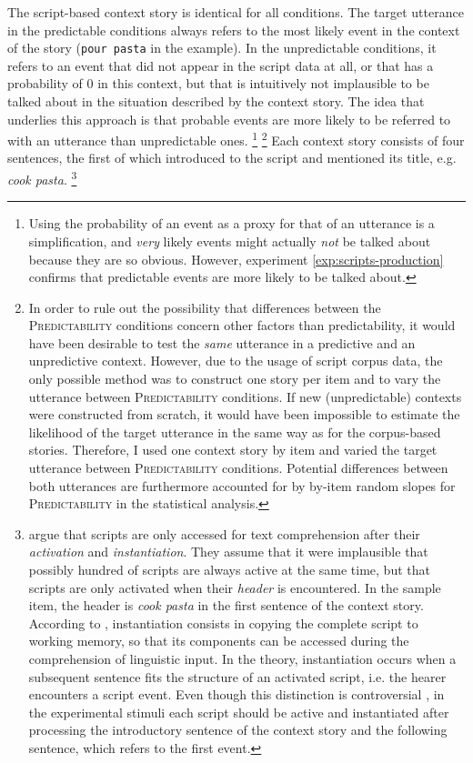 \largerpage[-2]
The script-based context story is identical for all conditions. The target utterance in the predictable conditions always refers to the most likely event in the context of the story (\texttt{pour pasta} in the example). In the unpredictable conditions, it refers to an event that did not appear in the script data at all, or that has a probability of 0 in this context, but that is intuitively not implausible to be talked about in the situation described by the context story. The idea that underlies this approach is that probable events are more likely to be referred to with an utterance than unpredictable ones.%
%
\footnote{Using the probability of an event as a proxy for that of an utterance is a simplification, and \textit{very} likely events might actually \textit{not} be talked about because they are so obvious. However, experiment \ref{exp:scripts-production} confirms that predictable events are more likely to be talked about.}\afterfn%
%
\footnote{In order to rule out the possibility that differences between the \textsc{Predictability} conditions concern other factors than predictability, it would have been desirable to test the \textit{same} utterance in a predictive and an unpredictive context. However, due to the usage of script corpus data, the only possible method was to construct one story per item and to vary the utterance between \textsc{Predictability} conditions. If new (unpredictable) contexts were constructed from scratch, it would have been impossible to estimate the likelihood of the target utterance in the same way as for the corpus-based stories. Therefore, I used one context story by item and varied the target utterance between \textsc{Predictability} conditions. Potential differences between both utterances are furthermore accounted for by by-item random slopes for \textsc{Predictability} in the statistical analysis.}\afterfn%
%
Each context story consists of four sentences, the first of which introduced to the script and mentioned its title, e.g. \textit{cook pasta}.%
% 
\footnote{\citet{schank.abelson1977} argue that scripts are only accessed for text comprehension after their \textit{activation} and \textit{instantiation}. They assume that it were implausible that possibly hundred of scripts are always active at the same time, but that scripts are only activated when their \textit{header} is encountered. In the sample item, the header is \textit{cook pasta} in the first sentence of the context story. According to \citet[47--48]{schank.abelson1977}, instantiation consists in copying the complete script to working memory, so that its components can be accessed during the comprehension of linguistic input. In the theory, instantiation occurs when a subsequent sentence fits the structure of an activated script, i.e. the hearer encounters a script event. Even though this distinction is controversial \citep[see e.g.][]{rabs.etal2017}, in the experimental stimuli each script should be active and instantiated after processing the introductory sentence of the context story and the following sentence, which refers to the first event.}\afterfn%
